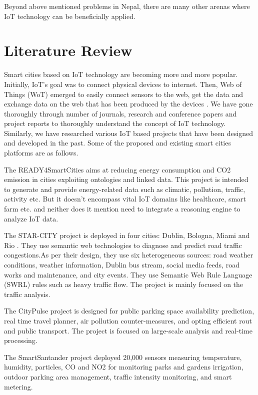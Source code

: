 \documentclass[journal,twoside]{IEEEtran}
\begin{document}
Beyond above mentioned problems in Nepal, there are
many other arenas where IoT technology can be beneficially
applied.

\section{Literature Review}

Smart cities based on IoT technology are becoming more and
more popular. Initially, IoT's goal was to connect physical
devices to internet. Then, Web of Things (WoT) emerged to
easily connect sensors to the web, get the data and exchange
data on the web that has been produced by the devices \cite{Zeng2011}. We
have gone thoroughly through number of journals, research and
conference papers and project reports to thoroughly understand
the concept of IoT technology. Similarly, we have researched
various IoT based projects that have been designed and
developed in the past. Some of the proposed and existing smart
cities platforms are as follows.

The READY4SmartCities \cite{Raul2014} aims at reducing energy
consumption and CO2 emission in cities exploiting ontologies
and linked data. This project is intended to generate and provide
energy-related data such as climatic, pollution, traffic, activity
etc. But it doesn’t encompass vital IoT domains like healthcare,
smart farm etc. and neither does it mention need to integrate a
reasoning engine to analyze IoT data.

The STAR-CITY project is deployed in four cities: Dublin,
Bologna, Miami and Rio \cite{Lecue2014}. They use semantic web
technologies to diagnose and predict road traffic congestions.As per their design, they use six heterogeneous sources: road
weather conditions, weather information, Dublin bus stream,
social media feeds, road works and maintenance, and city
events. They use Semantic Web Rule Language (SWRL) rules
such as heavy traffic flow. The project is mainly focused on the
traffic analysis.

The CityPulse \cite{Barnaghi2014} project is designed for public parking space
availability prediction, real time travel planner, air pollution
counter-measures, and opting efficient rout and public
transport. The project is focused on large-scale analysis and
real-time processing.

The SmartSantander\cite{Sanchez2011} project deployed 20,000 sensors
measuring temperature, humidity, particles, CO and NO2 for
monitoring parks and gardens irrigation, outdoor parking area
management, traffic intensity monitoring, and smart metering.
\end{document}
